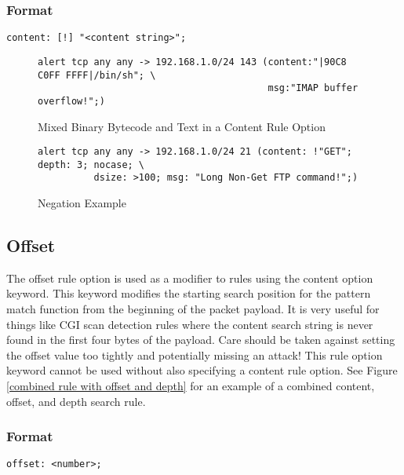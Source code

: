 \documentclass[english]{report}
\begin{document}
\subsubsection{Format}

\begin{verbatim}
content: [!] "<content string>";
\end{verbatim}
%
\begin{figure}[!hbpt]
\begin{verbatim}
alert tcp any any -> 192.168.1.0/24 143 (content:"|90C8 C0FF FFFF|/bin/sh"; \
                                         msg:"IMAP buffer overflow!";)
\end{verbatim}

\caption{\label{mixed content example}Mixed Binary Bytecode and Text in a
Content Rule Option }
\end{figure}
%
\begin{figure}[!hbpt]
\begin{verbatim}
alert tcp any any -> 192.168.1.0/24 21 (content: !"GET"; depth: 3; nocase; \
          dsize: >100; msg: "Long Non-Get FTP command!";)
\end{verbatim}

\caption{\label{content negation example}Negation Example}
\end{figure}



\subsection{Offset}

The offset rule option is used as a modifier to rules using the content
option keyword. This keyword modifies the starting search position
for the pattern match function from the beginning of the packet payload.
It is very useful for things like CGI scan detection rules where the
content search string is never found in the first four bytes of the
payload. Care should be taken against setting the offset value too
tightly and potentially missing an attack! This
rule option keyword cannot be used without also specifying a content
rule option. See Figure \ref{combined rule with offset and depth}
for an example of a combined content, offset, and depth search rule.


\subsubsection{Format}

\begin{verbatim}
offset: <number>;
\end{verbatim}
\end{document}
